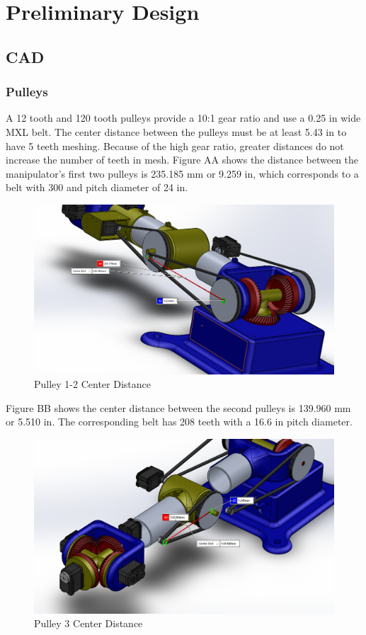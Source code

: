 \documentclass[12pt]{report}
\begin{document}
\newpage
\section{Preliminary Design}
\subsection{CAD}
\subsubsection{Pulleys}
A 12 tooth and 120 tooth pulleys provide a 10:1 gear ratio and use a 0.25 in wide MXL belt. The center distance between the pulleys must be at least 5.43 in to have 5 teeth meshing. Because of the high gear ratio, greater distances do not increase the number of teeth in mesh. Figure AA shows the distance between the manipulator’s first two pulleys is 235.185 mm or 9.259 in, which corresponds to a belt with 300 and pitch diameter of 24 in.\\
\begin{figure}[htp]
  \center
  \includegraphics[width=.65\textwidth,frame]{pulley12}
  \caption{Pulley 1-2 Center Distance}
\end{figure}
Figure BB shows the center distance between the second pulleys is 139.960 mm or 5.510 in. The corresponding belt has 208 teeth with a 16.6 in pitch diameter.
\begin{figure}[htp]
  \center
  \includegraphics[width=.65\textwidth,frame]{pulley3}
  \caption{Pulley 3 Center Distance}
\end{figure}
\end{document}
